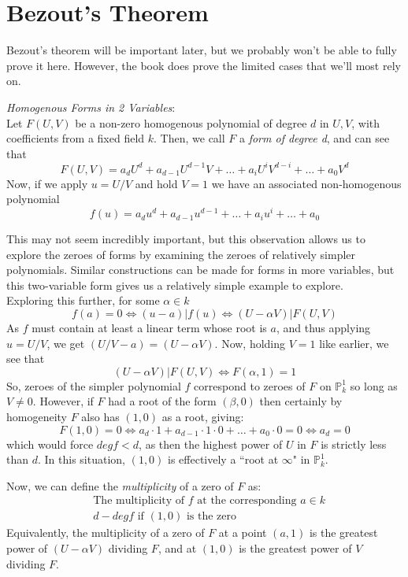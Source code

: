 \section{Bezout's Theorem}
Bezout's theorem will be important later, but we
probably won't be able to fully prove it here. However,
the book does prove the limited cases that we'll most rely on.

\begin{theorem}
\emph{Homogenous Forms in 2 Variables}:\\

Let $F(U,V)$ be a non-zero homogenous polynomial of degree $d$ in $U,V$,
with coefficients from a fixed field $k$. Then, we call $F$ a \emph{form of degree d},
and can see that
\[
F(U,V) = a_dU^d+a_{d-1}U^{d-1}V + \dots + a_iU^iV^{d-i}+\dots+a_0V^d
\]
Now, if we apply $u=U/V$ and hold $V=1$ we have an associated non-homogenous polynomial
\[
f(u) = a_du^d + a_{d-1}u^{d-1} + \dots + a_iu^i + \dots + a_0
\]
\end{theorem}


This may not seem incredibly important, but this observation
allows us to explore the zeroes of forms by examining the zeroes
of relatively simpler polynomials. Similar constructions can be made
for forms in more variables, but this two-variable form gives us a relatively
simple example to explore.\\

Exploring this further, for some $\alpha \in k$
\[ %
f(a) = 0 \iff (u-a)|f(u) \iff (U-\alpha V) | F(U,V)
\]
As $f$ must contain at least a linear term whose root is $a$, and
thus applying $u=U/V$, we get $(U/V - a) = (U - \alpha V)$. Now, 
holding $V=1$ like earlier, we see that
\[
(U-\alpha V) | F(U,V) \iff F(\alpha,1) = 1
\]
So, zeroes of the simpler polynomial $f$ correspond to zeroes of $F$
on $\mathbb{P}^1_k$ so long as $V \ne 0$. However, if $F$ had a root
of the form $(\beta,0)$ then certainly by homogeneity $F$ also has
$(1,0)$ as a root, giving:
\[
F(1,0) = 0 \iff a_d \cdot 1 + a_{d-1} \cdot 1 \cdot 0 + \dots + a_0 \cdot 0 = 0 \iff a_d = 0
\]
which would force $deg f < d$, as then the highest power of $U$ in $F$ is strictly
less than $d$. In this situation, $(1,0)$ is effectively a ``root at $\infty$" in $\mathbb{P}^1_k$.

Now, we can define the \emph{multiplicity} of a zero of $F$ as:
\begin{align*}
&\text{The multiplicity of $f$ at the corresponding $a \in k$} \tag{i}\\
&\text{$d - deg f$ if $(1,0)$ is the zero} \tag{ii}
\end{align*}
Equivalently, the multiplicity of a zero of $F$ at a point $(a,1)$
is the greatest power of $(U - \alpha V)$ dividing $F$, and at $(1,0)$
is the greatest power of $V$ dividing $F$.

